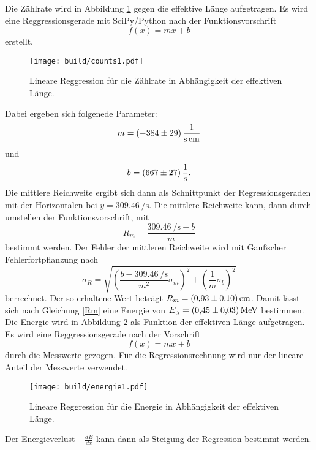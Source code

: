 \noindent Die Zählrate wird in Abbildung \ref{fig:c1} gegen die effektive Länge aufgetragen.
Es wird eine Reggressionsgerade mit SciPy/Python nach der Funktionsvorschrift
\begin{equation*}
  f(x) = mx +b
\end{equation*}
erstellt.
\begin{figure}[H]
  \centering
  \texttt{[image: build/counts1.pdf]}
  \caption{Lineare Reggression für die Zählrate in Abhängigkeit der effektiven Länge.}
  \label{fig:c1}
\end{figure}
\noindent Dabei ergeben sich folgenede Parameter:
\begin{equation*}
  m =\SI{-384\pm29}{\per\second\per\centi\meter}
\end{equation*}
und
\begin{equation*}
  b =\SI{667\pm27}{\per\second}.
\end{equation*}
Die mittlere Reichweite ergibt sich dann als Schnittpunkt der Regressionsgeraden mit der Horizontalen bei $y=\SI{309.46}{\per\second}$.
Die mittlere Reichweite kann, dann durch umstellen der Funktionsvorschrift, mit
\begin{equation*}
  R_m=\frac{\SI[per-mode=reciprocal]{309.46}{\per\second}-b}{m}
\end{equation*}
bestimmt werden.
Der Fehler der mittleren Reichweite wird mit Gaußscher Fehlerfortpflanzung nach
\begin{equation*}
  \sigma_R = \sqrt{\left(\frac{b-\SI{309.46}{\per\second}}{m^2}\sigma_m\right)^2 +\left(\frac{1}{m}\sigma_b\right)^2}
\end{equation*}
berrechnet.
Der so erhaltene Wert beträgt $R_m= \SI{0.93\pm0.1}{\centi\meter}$.
Damit lässt sich nach Gleichung \eqref{Rm} eine Energie von $E_{\alpha} = \SI{0.45\pm0.03}{\mega\electronvolt}$ bestimmen.
Die Energie wird in Abbildung \ref{fig:e1} als Funktion der effektiven Länge aufgetragen.
Es wird eine Reggressionsgerade nach der Vorschrift
\begin{equation*}
  f(x) = mx + b
\end{equation*}
durch die Messwerte gezogen.
Für die Regressionsrechnung wird nur der lineare Anteil der Messwerte verwendet.
\begin{figure}[H]
  \centering
  \texttt{[image: build/energie1.pdf]}
  \caption{Lineare Reggression für die Energie in Abhängigkeit der effektiven Länge.}
  \label{fig:e1}
\end{figure}
\noindent Der Energieverlust $-\frac{dE}{dx}$ kann dann als Steigung der Regression bestimmt werden.
